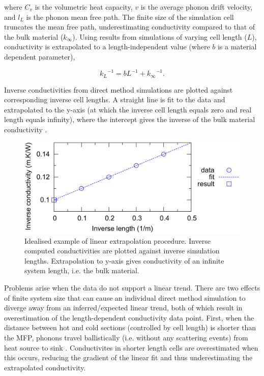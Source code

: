 where $C_v$ is the volumetric heat capacity, $v$ is the average phonon drift velocity, and $l_L$ is the phonon mean free path. The finite size of the simulation cell truncates the mean free path, underestimating conductivity compared to that of the bulk material ($k_\infty$). Using results from simulations of varying cell length ($L$), conductivity is extrapolated to a length-independent value (where $b$ is a material dependent parameter),

\begin{equation}
{k_{L}}^{-1} = b L^{-1} + {k_{\infty}}^{-1} \label{linear-extrap}.
\end{equation}

Inverse conductivities from direct method simulations are plotted against corresponding inverse cell lengths. A straight line is fit to the data and extrapolated to the y-axis (at which the inverse cell length equals zero and real length equals infinity), where the intercept gives the inverse of the bulk material conductivity \citep{Schelling2002}.

\begin{figure}[h]
  \includegraphics[width=\linewidth]{Figures/ideal_extrap.png}
  \caption{Idealised example of linear extrapolation procedure. Inverse computed conductivities are plotted against inverse simulation lengths. Extrapolation to y-axis gives conductivity of an infinite system length, i.e. the bulk material.}
  \label{fig:ideal}
\end{figure}

Problems arise when the data do not support a linear trend. There are two effects of finite system size that can cause an individual direct method simulation to diverge away from an inferred/expected linear trend, both of which result in overestimation of the length-dependent conductivity data point. First, when the distance between hot and cold sections (controlled by cell length) is shorter than the MFP, phonons travel ballistically (i.e. without any scattering events) from heat source to sink \citep{Sellan2010}. Conductivites in shorter length cells are overestimated when this occurs, reducing the gradient of the linear fit and thus underestimating the extrapolated conductivity.


